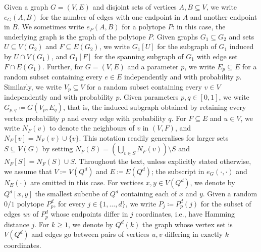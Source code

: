 \documentclass{article}
\theoremstyle{definition}
\begin{document}
Given a graph $G=(V,E)$ and disjoint sets of vertices $A,B\subseteq V$, we write $e_G(A,B)$ for the number of edges with one endpoint in $A$ and another endpoint in $B$.
We sometimes write $e_P(A,B)$ for a polytope $P$: in this case, the underlying graph is the graph of the polytope $P$.
Given graphs $G_1\subseteq G_2$ and sets $U\subseteq V(G_2)$ and $F\subseteq E(G_2)$, we write $G_1[U]$ for the subgraph of $G_1$ induced by $U\cap V(G_1)$, and $G_1[F]$ for the spanning subgraph of $G_1$ with edge set $F\cap E(G_1)$.
Further, for $G=(V,E)$ and a parameter $p$, we write $E_p\subseteq E$ for a random subset containing every $e\in E$ independently and with probability $p$. 
Similarly, we write $V_p\subseteq V$ for a random subset containing every $v\in V$ independently and with probability $p$. 
Given parameters $p,q\in[0,1]$, we write $G_{p,q}\coloneqq G(V_p,E_q)$, that is, the induced subgraph obtained by retaining every vertex probability $p$ and every edge with probability $q$. 
For $F\subseteq E$ and $u\in V$, we write $N_{F}(v)$ to denote the neighbours of $v$ in $(V,F)$, and $N_F[v] = N_F(v)\cup \{v\}$. This notation readily generalises for larger sets $S\subseteq V(G)$ by setting $N_F(S) = (\bigcup_{v\in S} N_F(v))\setminus S$ and $N_F[S] = N_F(S)\cup S$.
Throughout the text, unless explicitly stated otherwise, we assume that $V\coloneqq V(Q^d)$ and $E\coloneqq E(Q^d)$; the subscript in $e_G(\cdot,\cdot)$ and $N_E(\cdot)$ are omitted in this case.
For vertices $x,y\in V(Q^d)$, we denote by $Q^d[x,y]$ the smallest subcube of $Q^d$ containing each of $x$ and $y$. 
Given a random $0/1$ polytope $P^d_p$, for every $j\in \{1,\ldots,d\}$, we write $P_j\coloneqq P^d_p(j)$ for the subset of edges $uv$ of $P^d_p$ whose endpoints differ in $j$ coordinates, i.e., have Hamming distance $j$. 
For $k\ge 1$, we denote by $Q^d(k)$ the graph whose vertex set is $V(Q^d)$ and edges go between pairs of vertices $u,v$ differing in exactly $k$ coordinates.
\end{document}
